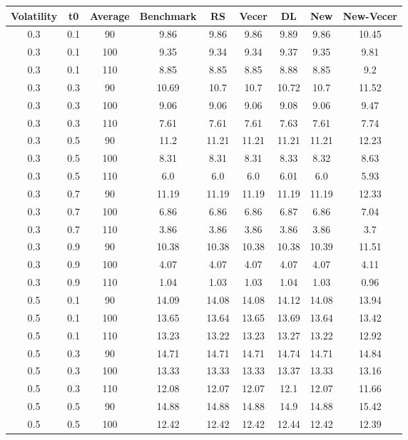 \documentclass[12pt]{report}
\begin{document}
\begin{table}[H]
  \begin{tabular}{|c|c|c|c|c|c|c|c|c|}
  \hline
  Volatility & t0 & Average & Benchmark & RS & Vecer & DL & New & New-Vecer \\
  \hline
  0.3 & 0.1 & 90 & 9.86 & 9.86 & 9.86 & 9.89 & 9.86 & 10.45 \\
  0.3 & 0.1 & 100 & 9.35 & 9.34 & 9.34 & 9.37 & 9.35 & 9.81 \\
  0.3 & 0.1 & 110 & 8.85 & 8.85 & 8.85 & 8.88 & 8.85 & 9.2 \\
  0.3 & 0.3 & 90 & 10.69 & 10.7 & 10.7 & 10.72 & 10.7 & 11.52 \\
  0.3 & 0.3 & 100 & 9.06 & 9.06 & 9.06 & 9.08 & 9.06 & 9.47 \\
  0.3 & 0.3 & 110 & 7.61 & 7.61 & 7.61 & 7.63 & 7.61 & 7.74 \\
  0.3 & 0.5 & 90 & 11.2 & 11.21 & 11.21 & 11.21 & 11.21 & 12.23 \\
  0.3 & 0.5 & 100 & 8.31 & 8.31 & 8.31 & 8.33 & 8.32 & 8.63 \\
  0.3 & 0.5 & 110 & 6.0 & 6.0 & 6.0 & 6.01 & 6.0 & 5.93 \\
  0.3 & 0.7 & 90 & 11.19 & 11.19 & 11.19 & 11.19 & 11.19 & 12.33 \\
  0.3 & 0.7 & 100 & 6.86 & 6.86 & 6.86 & 6.87 & 6.86 & 7.04 \\
  0.3 & 0.7 & 110 & 3.86 & 3.86 & 3.86 & 3.86 & 3.86 & 3.7 \\
  0.3 & 0.9 & 90 & 10.38 & 10.38 & 10.38 & 10.38 & 10.39 & 11.51 \\
  0.3 & 0.9 & 100 & 4.07 & 4.07 & 4.07 & 4.07 & 4.07 & 4.11 \\
  0.3 & 0.9 & 110 & 1.04 & 1.03 & 1.03 & 1.04 & 1.03 & 0.96 \\
  0.5 & 0.1 & 90 & 14.09 & 14.08 & 14.08 & 14.12 & 14.08 & 13.94 \\
  0.5 & 0.1 & 100 & 13.65 & 13.64 & 13.65 & 13.69 & 13.64 & 13.42 \\
  0.5 & 0.1 & 110 & 13.23 & 13.22 & 13.23 & 13.27 & 13.22 & 12.92 \\
  0.5 & 0.3 & 90 & 14.71 & 14.71 & 14.71 & 14.74 & 14.71 & 14.84 \\
  0.5 & 0.3 & 100 & 13.33 & 13.33 & 13.33 & 13.37 & 13.33 & 13.16 \\
  0.5 & 0.3 & 110 & 12.08 & 12.07 & 12.07 & 12.1 & 12.07 & 11.66 \\
  0.5 & 0.5 & 90 & 14.88 & 14.88 & 14.88 & 14.9 & 14.88 & 15.42 \\
  0.5 & 0.5 & 100 & 12.42 & 12.42 & 12.42 & 12.44 & 12.42 & 12.39 \\

\end{tabular}
\end{table}
\end{document}
